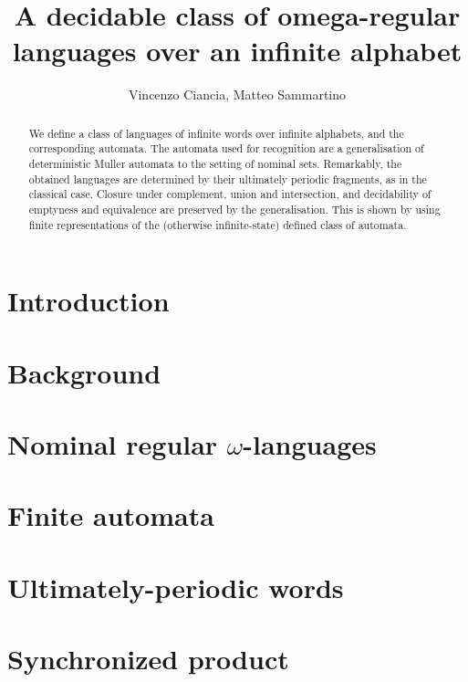 \documentclass[orivec]{llncs}
\title{A decidable class of omega-regular languages over an infinite alphabet}
\author{Vincenzo Ciancia, Matteo Sammartino}
\institute{}
\begin{document}
\maketitle

\begin{abstract}
 We define a class of languages of infinite words over infinite alphabets, and the corresponding automata. The automata used for recognition are a generalisation of deterministic Muller automata to the setting of nominal sets. Remarkably, the obtained languages are determined by their ultimately periodic fragments, as in the classical case. Closure under complement, union and intersection, and decidability of emptyness and equivalence are preserved by the generalisation. This is shown by using finite representations of the (otherwise infinite-state) defined class of automata.
\end{abstract}

\section{Introduction}\label{sec:introduction}

\section{Background}\label{sec:background}

\section{Nominal regular $\omega$-languages}\label{sec:languages}


\section{Finite automata}\label{sec:hd-automata}



\section{Ultimately-periodic words}\label{sec:up-determinacy}

\section{Synchronized product}\label{sec:sync-product}

\end{document}

